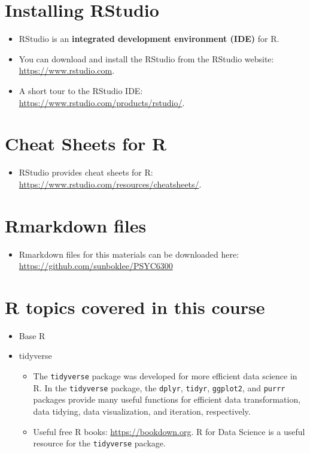 \documentclass[]{book}
\providecommand{\tightlist}{%
  \setlength{\itemsep}{0pt}\setlength{\parskip}{0pt}}
\begin{document}
\section{Installing RStudio}\label{installing-rstudio}

\begin{itemize}
\item
  RStudio is an \textbf{integrated development environment (IDE)} for R.
\item
  You can download and install the RStudio from the RStudio website:
  \url{https://www.rstudio.com}.
\item
  A short tour to the RStudio IDE:
  \url{https://www.rstudio.com/products/rstudio/}.
\end{itemize}

\section{Cheat Sheets for R}\label{cheat-sheets-for-r}

\begin{itemize}
\tightlist
\item
  RStudio provides cheat sheets for R:
  \url{https://www.rstudio.com/resources/cheatsheets/}.
\end{itemize}

\section{Rmarkdown files}\label{rmarkdown-files}

\begin{itemize}
\tightlist
\item
  Rmarkdown files for this materials can be downloaded here:
  \url{https://github.com/sunboklee/PSYC6300}
\end{itemize}

\section{R topics covered in this
course}\label{r-topics-covered-in-this-course}

\begin{itemize}
\tightlist
\item
  Base R
\item
  tidyverse

  \begin{itemize}
  \tightlist
  \item
    The \texttt{tidyverse} package was developed for more efficient data
    science in R. In the \texttt{tidyverse} package, the \texttt{dplyr},
    \texttt{tidyr}, \texttt{ggplot2}, and \texttt{purrr} packages
    provide many useful functions for efficient data transformation,
    data tidying, data visualization, and iteration, respectively.
  \item
    Useful free R books: \url{https://bookdown.org}. R for Data Science
    \citep{Wickham} is a useful resource for the \texttt{tidyverse}
    package.
  \end{itemize}
\end{itemize}
\end{document}
